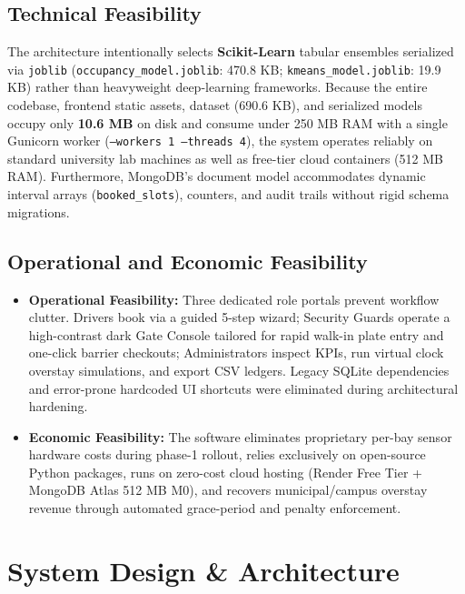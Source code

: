 \documentclass[12pt,a4paper,oneside]{report}
\begin{document}
\section{Technical Feasibility}
The architecture intentionally selects \textbf{Scikit-Learn} tabular ensembles serialized via \texttt{joblib} (\texttt{occupancy\_model.joblib}: 470.8 KB; \texttt{kmeans\_model.joblib}: 19.9 KB) rather than heavyweight deep-learning frameworks. Because the entire codebase, frontend static assets, dataset (690.6 KB), and serialized models occupy only \textbf{10.6 MB} on disk and consume under 250 MB RAM with a single Gunicorn worker (\texttt{--workers 1 --threads 4}), the system operates reliably on standard university lab machines as well as free-tier cloud containers (512 MB RAM). Furthermore, MongoDB's document model accommodates dynamic interval arrays (\texttt{booked\_slots}), counters, and audit trails without rigid schema migrations.

\section{Operational and Economic Feasibility}
\begin{itemize}[leftmargin=*]
  \item \textbf{Operational Feasibility:} Three dedicated role portals prevent workflow clutter. Drivers book via a guided 5-step wizard; Security Guards operate a high-contrast dark Gate Console tailored for rapid walk-in plate entry and one-click barrier checkouts; Administrators inspect KPIs, run virtual clock overstay simulations, and export CSV ledgers. Legacy SQLite dependencies and error-prone hardcoded UI shortcuts were eliminated during architectural hardening.
  \item \textbf{Economic Feasibility:} The software eliminates proprietary per-bay sensor hardware costs during phase-1 rollout, relies exclusively on open-source Python packages, runs on zero-cost cloud hosting (Render Free Tier + MongoDB Atlas 512 MB M0), and recovers municipal/campus overstay revenue through automated grace-period and penalty enforcement.
\end{itemize}

\chapter{System Design \& Architecture}
\end{document}
